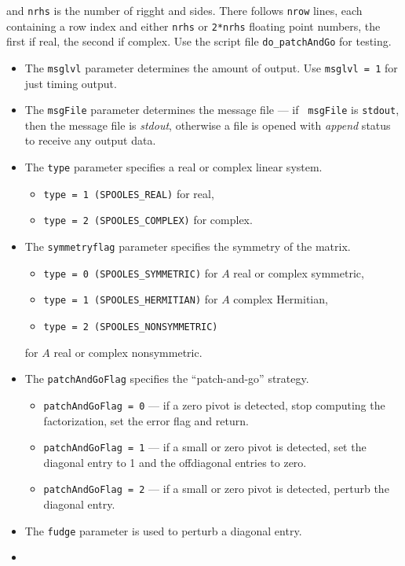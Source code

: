 \begin{enumerate}
and {\tt nrhs} is the number of rigght and sides.
There follows {\tt nrow} lines, each containing a row index
and either {\tt nrhs} or {\tt 2*nrhs} floating point numbers, 
the first if real, the second if complex.
Use the script file {\tt do\_patchAndGo} for testing.
\par
\begin{itemize}
\item
The {\tt msglvl} parameter determines the amount of output.
Use {\tt msglvl = 1} for just timing output.
\item
The {\tt msgFile} parameter determines the message file --- if {\tt
msgFile} is {\tt stdout}, then the message file is {\it stdout},
otherwise a file is opened with {\it append} status to receive any
output data.
\item
The {\tt type} parameter specifies a real or complex linear system.
\begin{itemize}
\item
{\tt type = 1 (SPOOLES\_REAL)} for real,
\item
{\tt type = 2 (SPOOLES\_COMPLEX)} for complex.
\end{itemize}
\item
The {\tt symmetryflag} parameter specifies the symmetry of the matrix.
\begin{itemize}
\item
{\tt type = 0 (SPOOLES\_SYMMETRIC)} for $A$ real or complex symmetric,
\item
{\tt type = 1 (SPOOLES\_HERMITIAN)} for $A$ complex Hermitian,
\item
{\tt type = 2 (SPOOLES\_NONSYMMETRIC)}
\end{itemize}
for $A$ real or complex nonsymmetric.
\item
The {\tt patchAndGoFlag} specifies the ``patch-and-go'' strategy.
\begin{itemize}
\item
{\tt patchAndGoFlag = 0} --- if a zero pivot is detected, stop
computing the factorization, set the error flag and return.
\item
{\tt patchAndGoFlag = 1} --- if a small or zero pivot is detected,
set the diagonal entry to 1 and the offdiagonal entries to zero.
\item
{\tt patchAndGoFlag = 2} --- if a small or zero pivot is detected,
perturb the diagonal entry.
\end{itemize}
\item
The {\tt fudge} parameter is used to perturb a diagonal entry.
\item

\end{itemize}
\end{enumerate}
